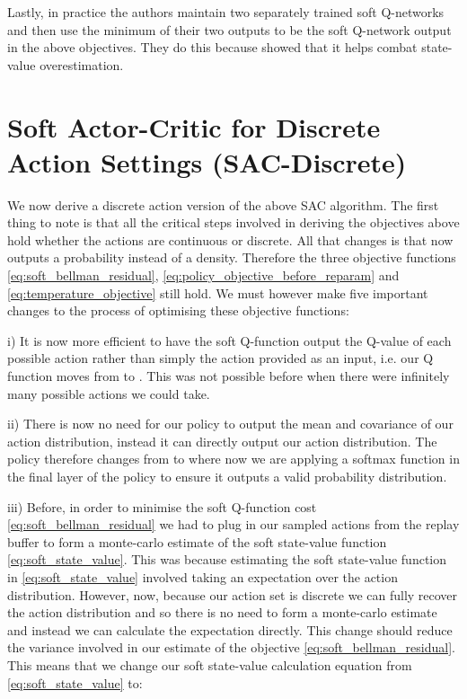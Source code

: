 \documentclass{article}
\begin{document}
Lastly, in practice the authors maintain two separately trained soft Q-networks and then use the minimum of their two outputs to be the soft Q-network output in the above objectives. They do this because \citet{TD3} showed that it helps combat state-value overestimation.


\section{Soft Actor-Critic for Discrete Action Settings (SAC-Discrete)}

We now derive a discrete action version of the above SAC algorithm. The first thing to note is that all the critical steps involved in deriving the objectives above hold whether the actions are continuous or discrete. All that changes is that  now outputs a probability instead of a density. Therefore the three objective functions  \eqref{eq:soft_bellman_residual},  \eqref{eq:policy_objective_before_reparam} and  \eqref{eq:temperature_objective} still hold. We must however make five important changes to the process of optimising these objective functions:

i) It is now more efficient to have the soft Q-function output the Q-value of each possible action rather than simply the action provided as an input, i.e. our Q function moves from  to . This was not possible before when there were infinitely many possible actions we could take. 

ii) There is now no need for our policy to output the mean and covariance of our action distribution, instead it can directly output our action distribution. The policy therefore changes from  to  where now we are applying a softmax function in the final layer of the policy to ensure it outputs a valid probability distribution.

iii) Before, in order to minimise the soft Q-function cost  \eqref{eq:soft_bellman_residual} we had to plug in our sampled actions from the replay buffer to form a monte-carlo estimate of the soft state-value function \eqref{eq:soft_state_value}. This was because estimating the soft state-value function in \eqref{eq:soft_state_value} involved taking an expectation over the action distribution.  However, now, because our action set is discrete we can fully recover the action distribution and so there is no need to form a monte-carlo estimate and instead we can calculate the expectation directly. This change should reduce the variance involved in our estimate of the objective  \eqref{eq:soft_bellman_residual}. This means that we change our soft state-value calculation equation from \eqref{eq:soft_state_value} to:
\end{document}
